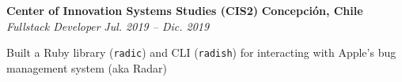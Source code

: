 \item
\headerrow
{\textbf{Center of Innovation Systems Studies (CIS2)}}
{\textbf{Concepción, Chile}}
\headerrow
{\emph{Fullstack Developer}}
{\emph{Jul. 2019 -- Dic. 2019}}
\begin{itemize*}
    \item Built a Ruby library (\texttt{radic}) and CLI (\texttt{radish}) for
    interacting with Apple's bug management system (aka Radar)
\end{itemize*}